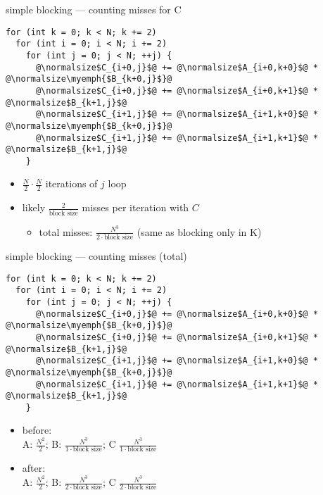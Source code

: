 \begin{frame}[fragile,label=cacheBlockExamplePartialMissesC]{simple blocking --- counting misses for C}
\lstset{style=small,language=C,escapechar=@}
\begin{lstlisting}
for (int k = 0; k < N; k += 2)
  for (int i = 0; i < N; i += 2)
    for (int j = 0; j < N; ++j) {
      @\normalsize$C_{i+0,j}$@ += @\normalsize$A_{i+0,k+0}$@ * @\normalsize\myemph{$B_{k+0,j}$}@
      @\normalsize$C_{i+0,j}$@ += @\normalsize$A_{i+0,k+1}$@ * @\normalsize$B_{k+1,j}$@
      @\normalsize$C_{i+1,j}$@ += @\normalsize$A_{i+1,k+0}$@ * @\normalsize\myemph{$B_{k+0,j}$}@
      @\normalsize$C_{i+1,j}$@ += @\normalsize$A_{i+1,k+1}$@ * @\normalsize$B_{k+1,j}$@
    }
\end{lstlisting}
\begin{itemize}
\item $\frac{N}{2}\cdot\frac{N}{2}$ iterations of $j$ loop
\item likely $\frac{2}{\text{block size}}$ misses per iteration with $C$
    \begin{itemize}
    \item total misses: $\frac{N^3}{2\cdot\text{block size}}$ (same as blocking only in K)
    \end{itemize}
\end{itemize}
\end{frame}

\begin{frame}[fragile,label=cacheBlockExamplePartialMissesTot]{simple blocking --- counting misses (total)}
\lstset{style=small,language=C,escapechar=@}
\begin{lstlisting}
for (int k = 0; k < N; k += 2)
  for (int i = 0; i < N; i += 2)
    for (int j = 0; j < N; ++j) {
      @\normalsize$C_{i+0,j}$@ += @\normalsize$A_{i+0,k+0}$@ * @\normalsize\myemph{$B_{k+0,j}$}@
      @\normalsize$C_{i+0,j}$@ += @\normalsize$A_{i+0,k+1}$@ * @\normalsize$B_{k+1,j}$@
      @\normalsize$C_{i+1,j}$@ += @\normalsize$A_{i+1,k+0}$@ * @\normalsize\myemph{$B_{k+0,j}$}@
      @\normalsize$C_{i+1,j}$@ += @\normalsize$A_{i+1,k+1}$@ * @\normalsize$B_{k+1,j}$@
    }
\end{lstlisting}
\begin{itemize}
\item before: \\
A: $\frac{N^2}{2}$; B: $\frac{N^3}{1\cdot\text{block size}}$; C $\frac{N^3}{1\cdot\text{block size}}$
\item after: \\
A: $\frac{N^2}{2}$; B: $\frac{N^3}{2\cdot\text{block size}}$; C $\frac{N^3}{2\cdot\text{block size}}$
\end{itemize}
\end{frame}
